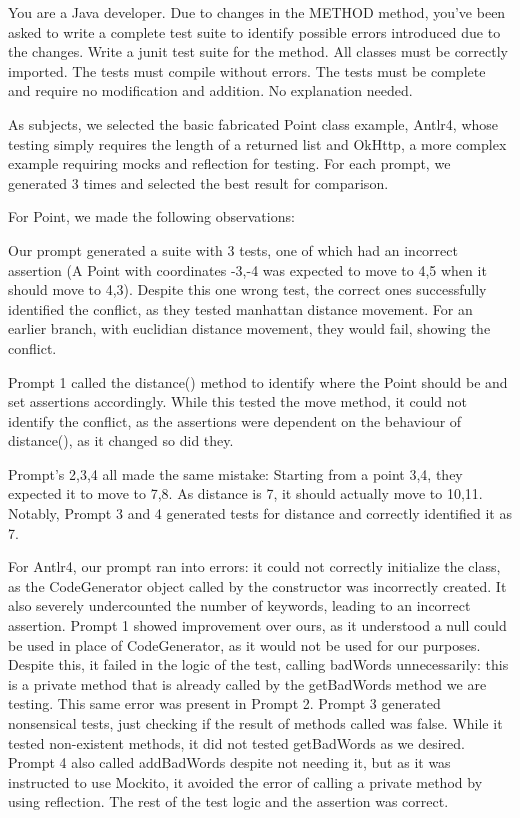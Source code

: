 \begin{prompt}
You are a Java developer. Due to changes in the METHOD method, you've been asked to write a complete test suite to identify possible errors introduced due to the changes. Write a junit test suite for the method. All classes must be correctly imported. The tests must compile without errors. The tests must be complete and require no modification and addition. No explanation needed.
\end{prompt}

As subjects, we selected the basic fabricated Point class example, Antlr4, whose testing simply requires the length of a returned list and OkHttp, a more complex example requiring mocks and reflection for testing.
For each prompt, we generated 3 times and selected the best result for comparison.

For Point, we made the following observations:

Our prompt generated a suite with 3 tests, one of which had an incorrect assertion (A Point with coordinates -3,-4 was expected to move to 4,5 when it should move to 4,3). Despite this one wrong test, the correct ones successfully identified the conflict, as they tested manhattan distance movement. For an earlier branch, with euclidian distance movement, they would fail, showing the conflict.

Prompt 1 called the distance() method to identify where the Point should be and set assertions accordingly. While this tested the move method, it could not identify the conflict, as the assertions were dependent on the behaviour of distance(), as it changed so did they.

Prompt's 2,3,4 all made the same mistake: Starting from a point 3,4, they expected it to move to 7,8. As distance is 7, it should actually move to 10,11. Notably, Prompt 3 and 4 generated tests for distance and correctly identified it as 7.

For Antlr4, our prompt ran into errors: it could not correctly initialize the class, as the CodeGenerator object called by the constructor was incorrectly created. It also severely undercounted the number of keywords, leading to an incorrect assertion.
Prompt 1 showed improvement over ours, as it understood a null could be used in place of CodeGenerator, as it would not be used for our purposes. Despite this, it failed in the logic of the test, calling badWords unnecessarily: this is a private method that is already called by the getBadWords method we are testing. This same error was present in Prompt 2.
Prompt 3 generated nonsensical tests, just checking if the result of methods called was false. While it tested non-existent methods, it did not tested getBadWords as we desired.
Prompt 4 also called addBadWords despite not needing it, but as it was instructed to use Mockito, it avoided the error of calling a private method by using reflection. The rest of the test logic and the assertion was correct.


